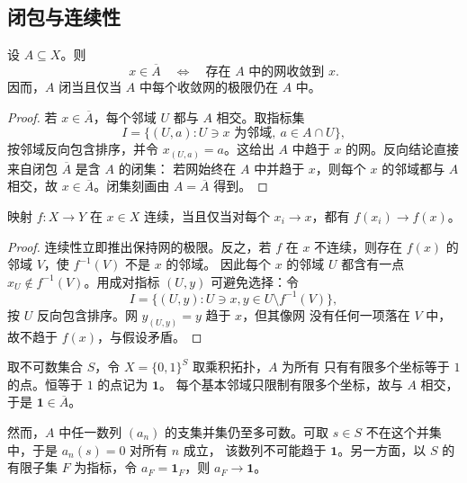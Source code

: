 \subsection{闭包与连续性}

\begin{theorem}[闭包的网刻画]
\label{thm:closure-by-nets}
设 \(A\subseteq X\)。则
\[
 x\in\overline A
 \quad\Longleftrightarrow\quad
 \text{存在 }A\text{ 中的网收敛到 }x.
\]
因而，\(A\) 闭当且仅当 \(A\) 中每个收敛网的极限仍在 \(A\) 中。
\end{theorem}

\begin{proof}
若 \(x\in\overline A\)，每个邻域 \(U\) 都与 \(A\) 相交。取指标集
\[
 I=\{(U,a):U\ni x\text{ 为邻域},\ a\in A\cap U\},
\]
按邻域反向包含排序，并令 \(x_{(U,a)}=a\)。这给出 \(A\) 中趋于
\(x\) 的网。反向结论直接来自闭包 \(\overline A\) 是含 \(A\) 的闭集：
若网始终在 \(A\) 中并趋于 \(x\)，则每个 \(x\) 的邻域都与 \(A\)
相交，故 \(x\in\overline A\)。闭集刻画由
\(A=\overline A\) 得到。
\end{proof}

\begin{theorem}[连续性的网判据]
\label{thm:continuity-by-nets}
映射 \(f:X\to Y\) 在 \(x\in X\) 连续，当且仅当对每个
\(x_i\to x\)，都有 \(f(x_i)\to f(x)\)。
\end{theorem}

\begin{proof}
连续性立即推出保持网的极限。反之，若 \(f\) 在 \(x\) 不连续，则存在
\(f(x)\) 的邻域 \(V\)，使 \(f^{-1}(V)\) 不是 \(x\) 的邻域。
因此每个 \(x\) 的邻域 \(U\) 都含有一点
\(x_U\notin f^{-1}(V)\)。用成对指标 \((U,y)\) 可避免选择：令
\[
 I=\{(U,y):U\ni x, y\in U\setminus f^{-1}(V)\},
\]
按 \(U\) 反向包含排序。网 \(y_{(U,y)}=y\) 趋于 \(x\)，但其像网
没有任何一项落在 \(V\) 中，故不趋于 \(f(x)\)，与假设矛盾。
\end{proof}

\begin{example}[序列不能刻画的闭包]
取不可数集合 \(S\)，令 \(X=\{0,1\}^{S}\) 取乘积拓扑，\(A\) 为所有
只有有限多个坐标等于 \(1\) 的点。恒等于 \(1\) 的点记为 \(\boldsymbol1\)。
每个基本邻域只限制有限多个坐标，故与 \(A\) 相交，于是
\(\boldsymbol1\in\overline A\)。

然而，\(A\) 中任一数列 \((a_n)\) 的支集并集仍至多可数。可取
\(s\in S\) 不在这个并集中，于是 \(a_n(s)=0\) 对所有 \(n\) 成立，
该数列不可能趋于 \(\boldsymbol1\)。另一方面，以 \(S\) 的有限子集
\(F\) 为指标，令 \(a_F=\boldsymbol1_F\)，则 \(a_F\to\boldsymbol1\)。
\end{example}

